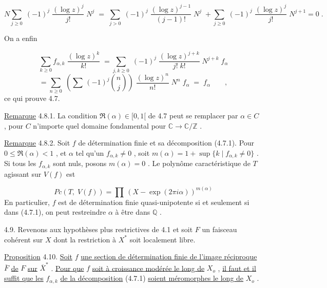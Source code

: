 \begin{equation*}
N \sum_{j \geq 0} \; (-1)^j \; \frac{(\log z)^j}{j!} \; N^j \; = \; \sum_{j > 0} \; (-1)^j \; \frac{(\log z)^{j-1}}{(j-1)!} \; N^j \; + \sum_{j \geq 0} \; (-1)^j \; \frac{(\log z)^j}{j!} \; N^{j+1} = 0 \; .
\end{equation*}


On a enfin

\begin{equation*}
\sum_{k \geq 0} f_{\alpha,k} \; \frac{(\log z)^k}{k!} \; = \sum_{j,k \geq 0} \; (-1)^j \; \frac{(\log z)^{j+k}}{j! \; k!} \; N^{j+k} \; f_\alpha
\end{equation*}
\begin{equation*}
= \sum_{n \geq 0} \; (\sum \, (-1)^j \binom{n}{j}) \; \frac{(\log z)^n}{n!} \; N^n \; f_\alpha \; = \; f_\alpha \qquad ,
\end{equation*}
ce qui prouve 4.7.

\underline{Remarque} 4.8.1. La condition $\Re(\alpha) \in [0, 1[$ de 4.7 peut se remplacer par $\alpha \in C$ , pour $C$ n'importe quel domaine fondamental pour $\mathbb{C} \to \mathbb{C}/\mathbb{Z}$ .

\underline{Remarque} 4.8.2. Soit $f$ de détermination finie et sa décomposition (4.7.1). Pour $0 \leq \Re(\alpha) < 1$ , et $\alpha$ tel qu'un $f_{\alpha,k} \neq 0$ , soit $m(\alpha) = 1 + \sup \{k \mid f_{\alpha,k} \neq 0\}$ . Si tous les $f_{\alpha,k}$ sont nuls, posons $m(\alpha) = 0$ . Le polynôme caractéristique de $T$ agissant sur $V(f)$ est

\begin{equation*}
Pc(T, \; V(f)) = \prod \, (X - \exp(2\pi i \alpha))^{m(\alpha)}
\end{equation*}
En particulier, $f$ est de détermination finie quasi-unipotente si et seulement si dans (4.7.1), on peut restreindre $\alpha$ à être dans $\mathbb{Q}$ .

4.9. Revenons aux hypothèses plus restrictives de 4.1 et soit $F$ un faisceau cohérent sur $X$ dont la restriction à $X^*$ soit localement libre.

\underline{Proposition} 4.10. \underline{Soit} $f$ \underline{une section de détermination finie de l'image réciproque} $\overline{F}$ \underline{de} $F$ \underline{sur} $\overline{X}^*$ . \underline{Pour que} $f$ \underline{soit à croissance modérée le long de} $X_o$ , \underline{il faut et il suffit que les} $f_{\alpha,k}$ \underline{de la décomposition} (4.7.1) \underline{soient méromorphes le long de} $X_o$ .

